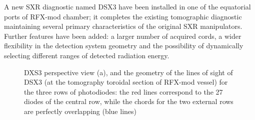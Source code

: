 A new SXR diagnostic named DSX3 have been installed in one of the equatorial ports of RFX-mod chamber; it completes the existing tomographic diagnostic maintaining several primary characteristics of the original SXR manipulators. Further
features have been added: a larger number of acquired cords, a wider flexibility in the detection system geometry and the possibility of dynamically selecting different ranges of detected radiation energy.
%
\begin{figure}
    \centering
    \caption{DXS3 perspective view (a), and the geometry of the lines of sight of DSX3 (at the tomography toroidal section
             of RFX-mod vessel) for the three rows of photodiodes: the red lines correspond to the
             27 diodes of the central row, while the chords for the two external rows are perfectly
             overlapping (blue lines) }
    \label{fig:DSX3_sketch}
\end{figure}




